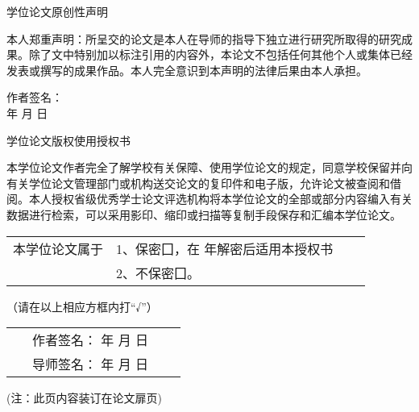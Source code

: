 \cleardoublepage
\thispagestyle{empty}
\begin{center}
    \heiti {} 学位论文原创性声明
\end{center}

{
     \songti

    本人郑重声明：所呈交的论文是本人在导师的指导下独立进行研究所取得的研究成果。除了文中特别加以标注引用的内容外，本论文不包括任何其他个人或集体已经发表或撰写的成果作品。本人完全意识到本声明的法律后果由本人承担。
    \begin{flushright}
            作者签名： \qquad ~\qquad~\\
            年 \qquad 月 \qquad 日 
    \end{flushright}
}

\vskip 100pt

\begin{center}
    \heiti {} 学位论文版权使用授权书
\end{center}
{
     \songti

    本学位论文作者完全了解学校有关保障、使用学位论文的规定，同意学校保留并向有关学位论文管理部门或机构送交论文的复印件和电子版，允许论文被查阅和借阅。本人授权省级优秀学士论文评选机构将本学位论文的全部或部分内容编入有关数据进行检索，可以采用影印、缩印或扫描等复制手段保存和汇编本学位论文。
    
    \begin{center}
        \begin{tabularx}{\linewidth}{lXXX}
            \hfill 本学位论文属于 & 1、保密囗，在 \qquad 年解密后适用本授权书  \\
            \hfill ~ & 2、不保密囗。
        \end{tabularx}
    \end{center}
    \begin{center}
        （请在以上相应方框内打“√”）
    \end{center}
    
    \mbox{} \vfill

    \begin{flushright}
        \begin{tabularx}{\linewidth}{XXXX}
            ~ & 作者签名： \qquad \qquad  年 \qquad 月 \qquad 日 \\
            ~ & 导师签名： \qquad \qquad  年 \qquad 月 \qquad 日
        \end{tabularx}
    \end{flushright}
    \begin{center}
        (注：此页内容装订在论文扉页)
    \end{center}
}